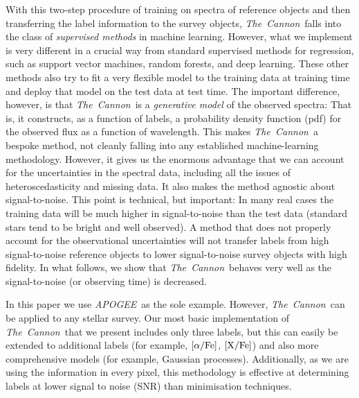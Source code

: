 \documentclass[12pt, preprint]{aastex}
\newcommand{\xfe}{\mbox{$\rm [X/Fe]$}}
\newcommand{\alphafe}{\mbox{$\rm [\alpha/Fe]$}}
\newcommand{\tc}{\textsl{The~Cannon}}
\newcommand{\apogee}{\textsl{APOGEE}}
\begin{document}
With this two-step procedure of training on spectra of reference objects and then transferring the label information to the survey objects, \tc\ falls into the class of \emph{supervised methods} in machine learning. 
However, what we implement is very different in a crucial way from standard supervised methods for regression, such as support vector machines, random forests, and deep learning.
These other methods also try to fit a very flexible model to the training data at training time
and deploy that model on the test data at test time.
The important difference, however, is that \tc\ is a \emph{generative model} of the observed spectra:
That is, it constructs, as a function of labels, a probability density function (pdf) for the observed
flux as a function of wavelength. 
This makes \tc\ a bespoke method, not cleanly falling into any established machine-learning methodology.
However, it gives us the enormous advantage that we can account for the uncertainties in the spectral data,
including all the issues of heteroscedasticity and missing data.
It also makes the method agnostic about signal-to-noise.
This point is technical, but important:
In many real cases the training data will be much higher in signal-to-noise than the test data
(standard stars tend to be bright and well observed).
A method that does not properly account for the observational uncertainties will not transfer labels from high signal-to-noise reference objects to lower signal-to-noise survey objects with high fidelity.
In what follows, we show that \tc\ behaves very well as the signal-to-noise (or observing time) is decreased.

In this paper we use \apogee\ as the sole example. 
However, \tc\ can be applied to any stellar survey.  
Our most basic implementation of \tc\ that we present includes only three labels, but this can easily be extended to additional labels  (for example, \alphafe, \xfe) and also more comprehensive models (for example, Gaussian processes). 
Additionally, as we are using the information in every pixel, this methodology is effective at determining labels at lower signal to noise (SNR) than minimisation techniques.%
\end{document}
